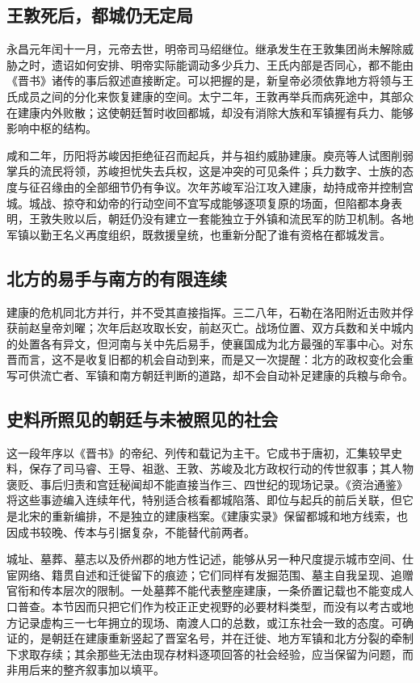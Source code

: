 \subsection{王敦死后，都城仍无定局}

永昌元年闰十一月，元帝去世，明帝司马绍继位。继承发生在王敦集团尚未解除威胁之时，遗诏如何安排、明帝实际能调动多少兵力、王氏内部是否同心，都不能由《晋书》诸传的事后叙述直接断定。可以把握的是，新皇帝必须依靠地方将领与王氏成员之间的分化来恢复建康的空间。太宁二年，王敦再举兵而病死途中，其部众在建康内外败散；这使朝廷暂时收回都城，却没有消除大族和军镇握有兵力、能够影响中枢的结构。

咸和二年，历阳将苏峻因拒绝征召而起兵，并与祖约威胁建康。庾亮等人试图削弱掌兵的流民将领，苏峻担忧失去兵权，这是冲突的可见条件；兵力数字、士族的态度与征召缘由的全部细节仍有争议。次年苏峻军沿江攻入建康，劫持成帝并控制宫城。城战、掠夺和幼帝的行动空间不宜写成能够逐项复原的场面，但陷都本身表明，王敦失败以后，朝廷仍没有建立一套能独立于外镇和流民军的防卫机制。各地军镇以勤王名义再度组织，既救援皇统，也重新分配了谁有资格在都城发言。

\subsection{北方的易手与南方的有限连续}

建康的危机同北方并行，并不受其直接指挥。三二八年，石勒在洛阳附近击败并俘获前赵皇帝刘曜；次年后赵攻取长安，前赵灭亡。战场位置、双方兵数和关中城内的处置各有异文，但河南与关中先后易手，使襄国成为北方最强的军事中心。对东晋而言，这不是收复旧都的机会自动到来，而是又一次提醒：北方的政权变化会重写可供流亡者、军镇和南方朝廷判断的道路，却不会自动补足建康的兵粮与命令。

\subsection{史料所照见的朝廷与未被照见的社会}

这一段年序以《晋书》的帝纪、列传和载记为主干。它成书于唐初，汇集较早史料，保存了司马睿、王导、祖逖、王敦、苏峻及北方政权行动的传世叙事；其人物褒贬、事后归责和宫廷秘闻却不能直接当作三、四世纪的现场记录。《资治通鉴》将这些事迹编入连续年代，特别适合核看都城陷落、即位与起兵的前后关联，但它是北宋的重新编排，不是独立的建康档案。《建康实录》保留都城和地方线索，也因成书较晚、传本与引据复杂，不能替代前两者。

城址、墓葬、墓志以及侨州郡的地方性记述，能够从另一种尺度提示城市空间、仕宦网络、籍贯自述和迁徙留下的痕迹；它们同样有发掘范围、墓主自我呈现、追赠官衔和传本层次的限制。一处墓葬不能代表整座建康，一条侨置记载也不能变成人口普查。本节因而只把它们作为校正正史视野的必要材料类型，而没有以考古或地方记录虚构三一七年拥立的现场、南渡人口的总数，或江东社会一致的态度。可确证的，是朝廷在建康重新竖起了晋室名号，并在迁徙、地方军镇和北方分裂的牵制下求取存续；其余那些无法由现存材料逐项回答的社会经验，应当保留为问题，而非用后来的整齐叙事加以填平。
